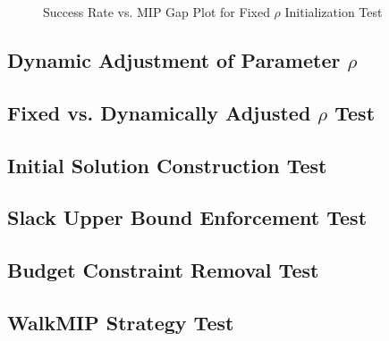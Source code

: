 \begin{figure}[thpb]
    \centering
    \begin{minipage}{0.6\columnwidth}
        \centering
        \resizebox{\linewidth}{!}{}
    \end{minipage}%
    \hfill
    \begin{minipage}{0.4\columnwidth}
        \centering
        \resizebox{\linewidth}{!}{}
    \end{minipage}
    \caption{Success Rate vs. MIP Gap Plot for Fixed $\rho$ Initialization Test}
    \label{fig:PACS_STD_MGAP_Int}
\end{figure}

\subsection{Dynamic Adjustment of Parameter $\rho$}\label{sec:test_dyn_rho}
\subsection{Fixed vs. Dynamically Adjusted $\rho$ Test}\label{sec:test_fixvsdyn_rho}
\subsection{Initial Solution Construction Test}\label{sec:test_init_sol}
\subsection{Slack Upper Bound Enforcement Test}\label{sec:test_slack_UB}
\subsection{Budget Constraint Removal Test}\label{sec:test_bdg_constr}
\subsection{WalkMIP Strategy Test}\label{sec:test_walkMIP}





